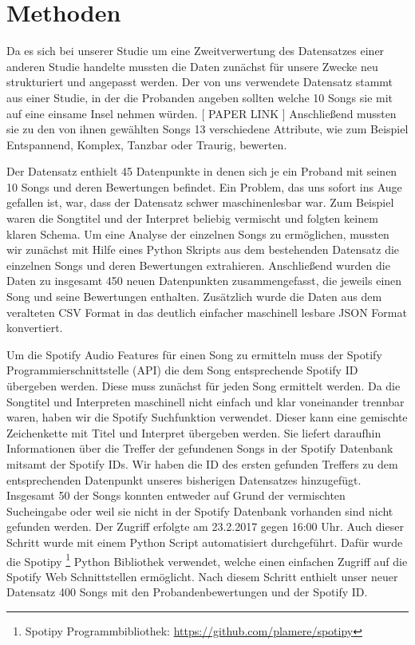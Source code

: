 \section*{Methoden}
\label{sec:Methoden}

Da es sich bei unserer Studie um eine Zweitverwertung des Datensatzes einer anderen Studie handelte mussten die Daten zunächst für unsere Zwecke neu strukturiert und angepasst werden.
Der von uns verwendete Datensatz stammt aus einer Studie, in der die Probanden angeben sollten welche 10 Songs sie mit auf eine einsame Insel nehmen würden. [ PAPER LINK ]
Anschließend mussten sie zu den von ihnen gewählten Songs 13 verschiedene Attribute, wie zum Beispiel Entspannend, Komplex, Tanzbar oder Traurig, bewerten.

Der Datensatz enthielt 45 Datenpunkte in denen sich je ein Proband mit seinen 10 Songs und deren Bewertungen befindet.
Ein Problem, das uns sofort ins Auge gefallen ist, war, dass der Datensatz schwer maschinenlesbar war. 
Zum Beispiel waren die Songtitel und der Interpret beliebig vermischt und folgten keinem klaren Schema.
Um eine Analyse der einzelnen Songs zu ermöglichen, mussten wir zunächst mit Hilfe eines Python Skripts aus dem bestehenden Datensatz die einzelnen Songs und deren Bewertungen extrahieren. 
Anschließend wurden die Daten zu insgesamt 450 neuen Datenpunkten zusammengefasst, die jeweils einen Song und seine Bewertungen enthalten.
Zusätzlich wurde die Daten aus dem veralteten CSV Format in das deutlich einfacher maschinell lesbare JSON Format konvertiert.

Um die Spotify Audio Features für einen Song zu ermitteln muss der Spotify Programmierschnittstelle (API) die dem Song entsprechende Spotify ID übergeben werden.
Diese muss zunächst für jeden Song ermittelt werden.
Da die Songtitel und Interpreten maschinell nicht einfach und klar voneinander trennbar waren, haben wir die Spotify Suchfunktion verwendet.
Dieser kann eine gemischte Zeichenkette mit Titel und Interpret übergeben werden.
Sie liefert daraufhin Informationen über die Treffer der gefundenen Songs in der Spotify Datenbank mitsamt der Spotify IDs.
Wir haben die ID des ersten gefunden Treffers zu dem entsprechenden Datenpunkt unseres bisherigen Datensatzes hinzugefügt.
Insgesamt 50 der Songs konnten entweder auf Grund der vermischten Sucheingabe oder weil sie nicht in der Spotify Datenbank vorhanden sind nicht gefunden werden.
Der Zugriff erfolgte am 23.2.2017 gegen 16:00 Uhr.
Auch dieser Schritt wurde mit einem Python Script automatisiert durchgeführt.
Dafür wurde die Spotipy \footnote{Spotipy Programmbibliothek: \url{https://github.com/plamere/spotipy}} Python Bibliothek verwendet, welche einen einfachen Zugriff auf die Spotify Web Schnittstellen ermöglicht.
Nach diesem Schritt enthielt unser neuer Datensatz 400 Songs mit den Probandenbewertungen und der Spotify ID.


